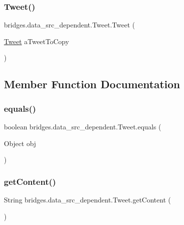 \subsubsection{\texorpdfstring{Tweet()}{Tweet()}\hspace{0.1cm}{\footnotesize\ttfamily [3/3]}}
{\footnotesize\ttfamily bridges.\+data\+\_\+src\+\_\+dependent.\+Tweet.\+Tweet (\begin{DoxyParamCaption}\item[{\mbox{\hyperlink{classbridges_1_1data__src__dependent_1_1_tweet}{Tweet}}}]{a\+Tweet\+To\+Copy }\end{DoxyParamCaption})}



\subsection{Member Function Documentation}
\mbox{\label{classbridges_1_1data__src__dependent_1_1_tweet_ae5edb76b9dd0f76b56eb40aa7c8cc077}} 
\subsubsection{\texorpdfstring{equals()}{equals()}}
{\footnotesize\ttfamily boolean bridges.\+data\+\_\+src\+\_\+dependent.\+Tweet.\+equals (\begin{DoxyParamCaption}\item[{Object}]{obj }\end{DoxyParamCaption})}

\mbox{\label{classbridges_1_1data__src__dependent_1_1_tweet_a9b48f1ffc14fea21eb8a3e742601974a}} 
\subsubsection{\texorpdfstring{getContent()}{getContent()}}
{\footnotesize\ttfamily String bridges.\+data\+\_\+src\+\_\+dependent.\+Tweet.\+get\+Content (\begin{DoxyParamCaption}{ }\end{DoxyParamCaption})}

